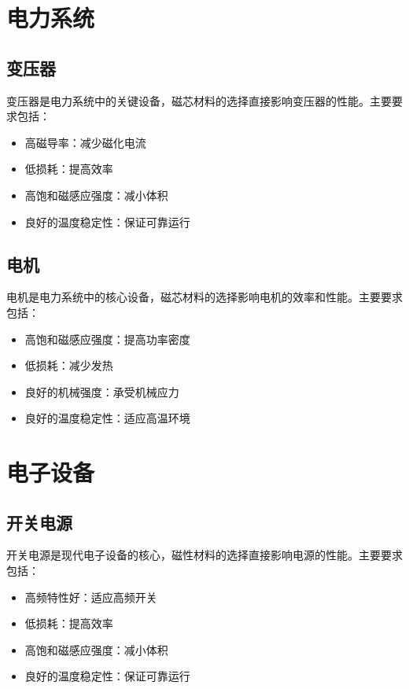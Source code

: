 \documentclass[12pt,UTF8]{ctexbook}
\begin{document}
\section{电力系统}

\subsection{变压器}

变压器是电力系统中的关键设备，磁芯材料的选择直接影响变压器的性能。主要要求包括：

\begin{itemize}[leftmargin=2cm]
    \item 高磁导率：减少磁化电流
    \item 低损耗：提高效率
    \item 高饱和磁感应强度：减小体积
    \item 良好的温度稳定性：保证可靠运行
\end{itemize}

\subsection{电机}

电机是电力系统中的核心设备，磁芯材料的选择影响电机的效率和性能。主要要求包括：

\begin{itemize}[leftmargin=2cm]
    \item 高饱和磁感应强度：提高功率密度
    \item 低损耗：减少发热
    \item 良好的机械强度：承受机械应力
    \item 良好的温度稳定性：适应高温环境
\end{itemize}

\section{电子设备}

\subsection{开关电源}

开关电源是现代电子设备的核心，磁性材料的选择直接影响电源的性能。主要要求包括：

\begin{itemize}[leftmargin=2cm]
    \item 高频特性好：适应高频开关
    \item 低损耗：提高效率
    \item 高饱和磁感应强度：减小体积
    \item 良好的温度稳定性：保证可靠运行
\end{itemize}
\end{document}
